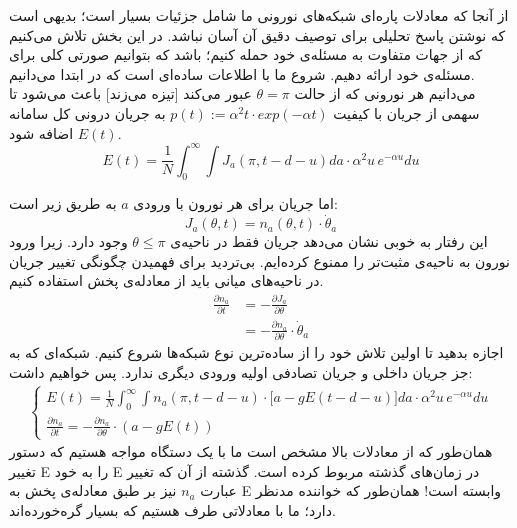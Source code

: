 
\label{chap:analytics}

از آنجا که معادلات پاره‌ای شبکه‌های نورونی ما شامل جزئیات بسیار است؛ بدیهی است که نوشتن پاسخ تحلیلی برای توصیف دقیق آن آسان نباشد. در این بخش تلاش می‌کنیم که از جهات متفاوت به مسئله‌ی خود حمله کنیم؛ باشد که بتوانیم صورتی کلی برای مسئله‌ی خود ارائه دهیم. شروع ما با اطلاعات ساده‌ای است که در ابتدا می‌دانیم.\\

می‌دانیم هر نورونی که از حالت $\theta = \pi$ عبور می‌کند [تیزه می‌زند] باعث می‌شود تا سهمی از جریان با کیفیت $p(t):= \alpha^2 t \cdot exp(-\alpha t)$ به جریان درونی کل سامانه $E(t)$ اضافه شود.
\begin{equation}
	E(t) = \frac{1}{N}\int_{0}^{\infty} \int J_a (\pi,t-d-u) da \cdot \alpha^2 u\, e^{-\alpha u} du 
	\label{eq:general_field}
\end{equation}

اما جریان برای هر نورون با ورودی $a$ به طریق زیر است:
\begin{equation}
	J_a (\theta, t) = n_a(\theta,t) \cdot \dot \theta_a
\end{equation}
این رفتار به خوبی نشان می‌دهد جریان فقط در ناحیه‌ی $\theta \leq \pi$ وجود دارد. زیرا ورود نورون به ناحیه‌ی مثبت‌تر را ممنوع کرده‌ایم.  بی‌تردید برای فهمیدن چگونگی تغییر جریان در ناحیه‌های میانی باید از معادله‌ی پخش استفاده کنیم.
\begin{align}
	\frac{\partial n_a}{\partial t} &= - \frac{\partial J_a}{\partial \theta} \label{eq:continuity_relation}\\
	&= - \frac{\partial n_a}{\partial \theta} \cdot \dot \theta_a
\end{align}
اجازه بدهید تا اولین تلاش خود را از ساده‌ترین نوع شبکه‌ها شروع کنیم. شبکه‌ای که به جز جریان داخلی و جریان تصادفی اولیه ورودی دیگری ندارد. پس خواهیم داشت:
\begin{align}
	\begin{cases}
		E(t) = \frac{1}{N} \int_{0}^{\infty} \int n_a(\pi,t-d-u) \cdot \big[ a - g E(t-d-u) \big] da \cdot \alpha^2 u\, e^{-\alpha u} du \\
		\frac{\partial n_a}{\partial t} = - \frac{\partial n_a}{\partial \theta} \cdot (a - g E(t) )
	\end{cases}
	\label{eq:simple_network}
\end{align}
همان‌طور که از معادلات بالا مشخص است ما با یک دستگاه مواجه هستیم که دستور تغییر E را به خود E در زمان‌های گذشته مربوط کرده است. گذشته از آن که تغییر عبارت
$n_a$
نیز بر طبق معادله‌ی پخش به E وابسته است! همان‌طور که خواننده مدنظر دارد؛ ما با معادلاتی طرف هستیم که بسیار گره‌خورده‌اند.\\

